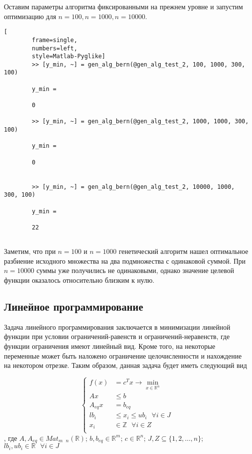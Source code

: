\documentclass[../main.tex]{subfiles}
\begin{document}
	Оставим параметры алгоритма фиксированными на прежнем уровне и запустим оптимизацию для $n=100, n=1000, n=10000$.
	
	 	\begin{lstlisting}[
	 	frame=single,
	 	numbers=left,
	 	style=Matlab-Pyglike]
	 	>> [y_min, ~] = gen_alg_bern(@gen_alg_test_2, 100, 1000, 300, 100)
	 	
	 	y_min =
	 	
	 	0
	 	
	 	>> [y_min, ~] = gen_alg_bern(@gen_alg_test_2, 1000, 1000, 300, 100)
	 	
	 	y_min =
	 	
	 	0
	 	
	 	
	 	>> [y_min, ~] = gen_alg_bern(@gen_alg_test_2, 10000, 1000, 300, 100)
	 	
	 	y_min =
	 	
	 	22
	 	
	 \end{lstlisting}
 
 	Заметим, что при $n=100$ и $n=1000$ генетический алгоритм нашел оптимальное разбиение исходного множества на два подмножества с одинаковой суммой. При $n=10000$ суммы уже получились не одинаковыми, однако значение целевой функции оказалось относительно близким к нулю.
 	
 	\subsection{Линейное программирование}
 	
 	Задача линейного программирования заключается в минимизации линейной функции при условии ограничений-равенств и ограничений-неравенств, где функции ограничения имеют линейный вид. Кроме того, на некоторые переменные может быть наложено ограничение целочисленности и нахождение на некотором отрезке. Таким образом, данная задача будет иметь следующий вид
 	
 	\[\left\{\begin{aligned}
 		f(x) &= c^T x \rightarrow \underset{x \in \mathbb{R}^n}{\min} \\ 
 		Ax &\leqslant b \\
 		A_{eq} x &= b_{eq} \\
 		lb_i &\leqslant x_i \leqslant ub_i \text{ } \forall i \in J \\
 		x_i &\in \mathbb{Z}  \text{ }  \forall i \in Z\\
 	\end{aligned}\right.\]
 	, где $A, A_{eq} \in Mat_{m \text{ } n}(\mathbb{R})$; $b, b_{eq} \in \mathbb{R}^m$; $c \in \mathbb{R}^n$; $J, Z \subseteq \{1, 2, \dots, n\}$; $lb_i, ub_i \in \mathbb{R} \text{ } \forall i \in J$
 	
\end{document}
